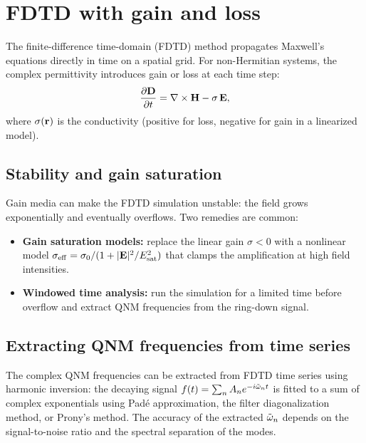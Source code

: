 \section{FDTD with gain and loss}
\label{sec:fdtd}

The finite-difference time-domain (FDTD) method propagates Maxwell's
equations directly in time on a spatial grid. For non-Hermitian systems,
the complex permittivity introduces gain or loss at each time step:
\begin{equation}
 \frac{\partial \mathbf{D}}{\partial t} = \nabla\times\mathbf{H} - \sigma\,\mathbf{E},
 \label{eq:fdtd-ampere}
\end{equation}
where $\sigma(\mathbf{r})$ is the conductivity (positive for loss, negative
for gain in a linearized model).

\subsection{Stability and gain saturation}
\label{ssec:fdtd-stability}

Gain media can make the FDTD simulation unstable: the field grows
exponentially and eventually overflows. Two remedies are common:
\begin{itemize}
 \item \textbf{Gain saturation models:} replace the linear gain
 $\sigma < 0$ with a nonlinear model
 $\sigma_{\mathrm{eff}} = \sigma_0 / (1 + |\mathbf{E}|^2/E_{\mathrm{sat}}^2)$
 that clamps the amplification at high field intensities.
 \item \textbf{Windowed time analysis:} run the simulation for a
 limited time before overflow and extract QNM frequencies from the
 ring-down signal.
\end{itemize}

\subsection{Extracting QNM frequencies from time series}
\label{ssec:harmonic-inversion}

The complex QNM frequencies can be extracted from FDTD time series
using harmonic inversion: the decaying signal $f(t) = \sum_n A_n
e^{-i\tilde{\omega}_n t}$ is fitted to a sum of complex exponentials using
Pad\'e approximation, the filter diagonalization method, or Prony's
method. The accuracy of the extracted $\tilde{\omega}_n$ depends on the
signal-to-noise ratio and the spectral separation of the modes.


